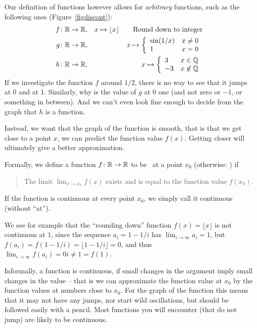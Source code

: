 Our definition of functions however allows for {\em arbitrary} functions, such as the
following ones (Figure~\ref{figdiscont}):
\begin{eqnarray*}
f\colon{\mathbb R}\to{\mathbb R}&,& x\mapsto \lfloor x\rfloor\qquad\mbox{Round down to integer}\\
g\colon{\mathbb R}\to{\mathbb R}&,& x\mapsto 
\left\{\begin{array}{ll}
\sin(1/x)&x\not=0\\
1&x=0\\
\end{array}
\right.\\
h\colon{\mathbb R}\to{\mathbb R}&,& x\mapsto 
\left\{\begin{array}{ll}
3&x\in{\mathbb Q}\\
-3&x\not\in{\mathbb Q}\\
\end{array}
\right.
\end{eqnarray*}
If we investigate the function $f$ around $1/2$, there is no way to see that it jumps at
0 and at 1. Similarly, why is the value of $g$ at $0$ one (and not zero or $-1$, or
something in between). And we can't even look fine enough to decide from the graph that
$h$ is a function.

Instead, we want that the graph of the function is smooth, that is that we get close to
a point $x$, we can predict the function value $f(x)$. Getting closer will ultimately
give a better approximation.

Formally, we define a function $f\colon{\mathbb R}\to{\mathbb R}$ to be~ at a point $x_0$
(otherwise: ) if
\begin{quote}
The limit $\displaystyle\lim_{x\to x_0} f(x)$ exists and is equal to the
function value $f(x_0)$.
\end{quote}

If the function is continuous at every point $x_0$, we simply call it continuous (without
``at'').

We see for example that the ``rounding down'' 
function $f(x)=\lfloor x\rfloor$  is not continuous at $1$,
since the sequence $a_i=1-1/i$ has $\lim_{i\to\infty} a_i=1$, but
$f(a_i)=f(1-1/i)=\lfloor 1-1/i\rfloor=0$, and thus $\lim_{i\to\infty}
f(a_i)=0i\not=1=f(1)$.
\medskip

Informally, a function is continuous, if small changes in the argument imply small
changes in the value -- that is we can approximate the function value at $x_0$ by the 
function values at numbers close to $x_0$. For the graph of the function
this means that it may not have any jumps, nor start wild oscillations, but
should be followed easily with a pencil. Most functions you will encounter
(that do not jump) are likely to be continuous.

